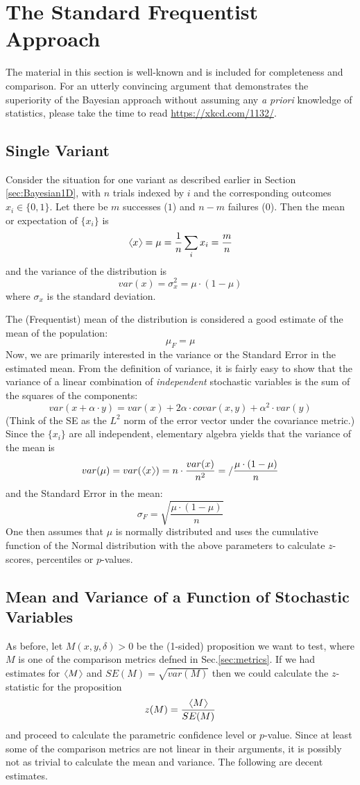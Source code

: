 \documentclass[12pt]{report}
\newcommand{\beq}{\begin{equation}} %
\newcommand{\eeq}{\end{equation}} %
\newcommand{\bdm}{\begin{displaymath}} %
\newcommand{\edm}{\end{displaymath}} %
\newcommand{\langl}{\begin{picture}(4.5,7)
\put(1.1,2.5){\rotatebox{60}{\line(1,0){5.5}}}
\put(1.1,2.5){\rotatebox{300}{\line(1,0){5.5}}}
\end{picture}}
\newcommand{\rangl}{\begin{picture}(4.5,7)
\put(.9,2.5){\rotatebox{120}{\line(1,0){5.5}}}
\put(.9,2.5){\rotatebox{240}{\line(1,0){5.5}}}
\end{picture}}
\newcommand{\mymean}[1]{\ensuremath{\langl{#1}\rangl}} %
\begin{document}
\section{The Standard Frequentist Approach\label{sec:frequentist}}
The material in this section is well-known and is included for completeness
and comparison. For an utterly convincing argument that demonstrates the
superiority of the Bayesian approach without assuming any {\em a priori}
knowledge of statistics, please take the time to read
\url{https://xkcd.com/1132/}.

\subsection{Single Variant}\label{sec:frequentist1D}
Consider the situation for one variant as described earlier in Section
\ref{sec:Bayesian1D}, with \(n\) trials indexed by \(i\) and the corresponding
outcomes \(x_i\in \{0,1\}\). Let there be \(m\) successes (\(1\))
and \(n-m\) failures (\(0\)). Then the mean or expectation of \(\{x_i\}\) is
\bdm
\mymean{x} = \mu = \frac{1}{n}\sum_i x_i = \frac{m}{n}
\edm
and the variance of the distribution is
\bdm
var(x) = \sigma^2_x = \mu\cdot(1-\mu)
\edm
where \(\sigma_x\) is the standard deviation.

The (Frequentist) mean of the distribution is considered a good estimate
of the mean of the population:
\bdm
\mu_F = \mu
\edm
Now, we are primarily interested in the variance or the
Standard Error in the estimated mean. From the definition of variance, it
is fairly easy to show that the variance of a linear combination of
{\em independent} stochastic variables is the sum of the squares of the
components:
\bdm
var(x+\alpha\cdot y) = var(x) + 2\alpha\cdot covar(x,y)+ \alpha^2\cdot var(y)
\edm
(Think of the SE as the \(L^2\) norm of the error vector under the covariance
metric.) Since the \(\{x_i\}\) are all independent, elementary algebra yields
that the variance of the mean is
\bdm
var(\mu) = var(\mymean{x}) = n\cdot\frac{var(x)}{n^2} =/
\frac{\mu\cdot(1-\mu)}{n}
\edm
and the Standard Error in the mean:
\bdm
\sigma_F = \sqrt{\frac{\mu\cdot(1-\mu)}{n}}
\edm
One then assumes that \(\mu\) is normally distributed and uses the
cumulative function of the Normal distribution with the above parameters to
calculate \(z\)-scores, percentiles or \(p\)-values.

\subsection{Mean and Variance of a Function of Stochastic Variables}
As before, let \(M(x,y,\delta)>0\) be the (1-sided) proposition we
want to test, where \(M\) is one of the comparison metrics defned in
Sec.\ref{sec:metrics}. If we had estimates for \mymean{M} and
\(SE(M)=\sqrt{var(M)}\) then we could calculate the \(z\)-statistic
for the proposition
\beq\label{eq:zstat}
z(M)= \frac{\mymean{M}}{SE(M)}
\eeq
and proceed to calculate the parametric confidence level or
\(p\)-value. Since at least some of the comparison metrics are not
linear in their arguments, it is possibly not as trivial to calculate
the mean and variance. The following are decent estimates.
\end{document}
